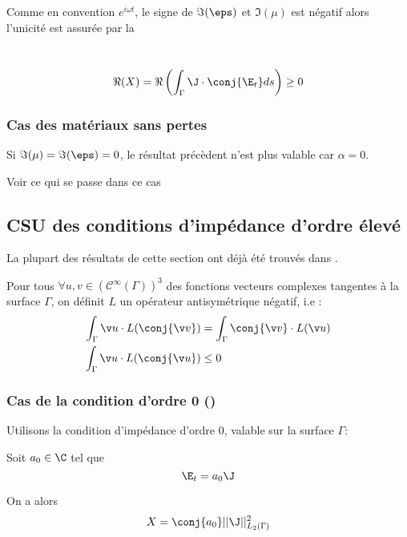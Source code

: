Comme en convention $e^{i\omega t}$, le signe de $\Im(\eps)$ et $\Im(\mu)$ est négatif
alors l'unicité est assurée par la
\begin{defn}~\\
\begin{equation}\label{eq:unicite:form_var:cgu}
\Re(X) = \Re\left(\int_\Gamma \J \cdot \conj{\E_t} ds\right) \ge 0
\end{equation}
\end{defn}

\subsubsection{Cas des matériaux sans pertes}

Si $\Im(\mu) = \Im(\eps) = 0$, le résultat précèdent n'est plus valable car $\alpha = 0$.

{%
\color{red}
Voir ce qui se passe dans ce cas
}
\subsection{CSU des conditions d'impédance d'ordre élevé}

La plupart des résultats de cette section ont déjà été trouvés dans \cite{stupfel_sufficient_2011}.


Pour tous $\forall u, v \in (\mathcal C^\infty(\Gamma))^3$ des fonctions vecteurs complexes tangentes à la surface $\Gamma$, on définit $L$ un opérateur antisymétrique négatif, i.e : 
\begin{align*}
\int_\Gamma \v u\cdot L(\conj{\v v}) &= \int_\Gamma \conj{\v v}\cdot L(\v u)\\
\int_\Gamma \v u\cdot L(\conj{\v u}) &\le 0
\end{align*}

\subsubsection{Cas de la condition d'ordre 0 (\cite{stupfel_sufficient_2011})}
Utilisons la condition d’impédance d'ordre 0, valable sur la surface $\Gamma$: 

Soit $a_0 \in \C$ tel que
\[
\E_t = a_0 \J
\]

On a alors
\begin{equation*}
X = \conj{a_0}||\J||_{L_2(\Gamma)}^2
\end{equation*}

